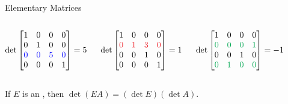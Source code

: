 \documentclass[xcolor=dvipsnames,aspectratio=169,t]{beamer}
\begin{document}
\begin{frame}{Elementary Matrices}

\begin{columns}
\column{0.3\tw}

  \medskip

  $\det \begin{bmatrix} 1 & 0 & 0 & 0 \\
  0 & 1 & 0 & 0 \\
  \textcolor{blue}{0} & \textcolor{blue}{0} & \textcolor{blue}{5} & \textcolor{blue}{0} \\
  0 & 0 & 0 & 1 \end{bmatrix} = 5$

\column{0.35\tw}

  \medskip

  $\det 
    \begin{bmatrix} 1 & 0 & 0 & 0 \\ \red{0} & \red{1} & \red{3} & \red{0} \\  0 & 0 & 1 & 0 \\ 0 & 0 & 0 & 1 \end{bmatrix} = 1$

\column{0.3\tw}

  \medskip

  $\det \begin{bmatrix} 1 & 0 & 0 & 0 \\
  \green{0} & \green{0} & \green{0} & \green{1} \\
  0 & 0 & 1 & 0 \\
  \green{0} & \green{1} & \green{0} & \green{0} \end{bmatrix} = -1$

\end{columns}
  \vspace*{2em}

  \bbox
  If $E$ is an , then $\det \left( E A \right) = \left( \det E \right) \left( \det A \right)$.
  \ebox
\end{frame}
\end{document}
